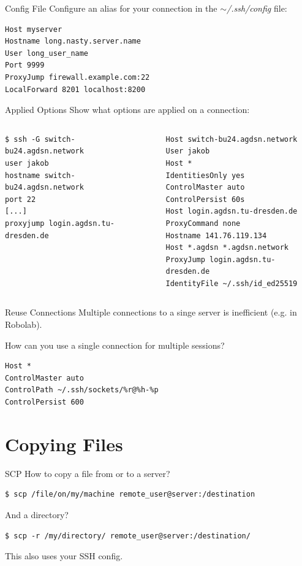 \documentclass[10pt,graphics,aspectratio=169,table]{beamer}
\begin{document}
\begin{frame}[fragile]{Config File}
	Configure an alias for your connection in the \textit{$\sim$/.ssh/config} file:
	\begin{lstlisting}
Host myserver
Hostname long.nasty.server.name
User long_user_name
Port 9999
ProxyJump firewall.example.com:22
LocalForward 8201 localhost:8200
	\end{lstlisting}
\end{frame}

\begin{frame}[fragile]{Applied Options}
	Show what options are applied on a connection:
	\begin{columns}
		\begin{lstlisting}
$ ssh -G switch-bu24.agdsn.network
user jakob
hostname switch-bu24.agdsn.network
port 22
[...]
proxyjump login.agdsn.tu-dresden.de
		\end{lstlisting}
		\begin{lstlisting}
Host switch-bu24.agdsn.network
User jakob
Host *
IdentitiesOnly yes
ControlMaster auto
ControlPersist 60s
Host login.agdsn.tu-dresden.de
ProxyCommand none
Hostname 141.76.119.134
Host *.agdsn *.agdsn.network
ProxyJump login.agdsn.tu-dresden.de
IdentityFile ~/.ssh/id_ed25519
		\end{lstlisting}
    \end{columns}
\end{frame}

\begin{frame}[fragile]{Reuse Connections}
	Multiple connections to a singe server is inefficient (e.g. in Robolab).

	How can you use a single connection for multiple sessions?
	\begin{lstlisting}
Host *
ControlMaster auto
ControlPath ~/.ssh/sockets/%r@%h-%p
ControlPersist 600
	\end{lstlisting}
\end{frame}

\section{Copying Files}
\begin{frame}[fragile]{SCP}
	How to copy a file from or to a server?
	\begin{lstlisting}
$ scp /file/on/my/machine remote_user@server:/destination
	\end{lstlisting}
	And a directory?
	\begin{lstlisting}
$ scp -r /my/directory/ remote_user@server:/destination/
	\end{lstlisting}
	This also uses your SSH config.
\end{frame}
\end{document}
